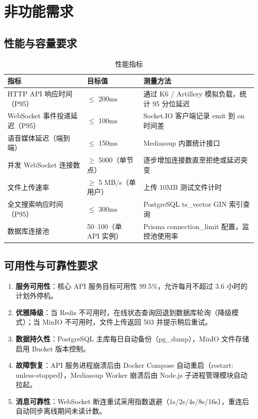 \section{非功能需求}

\subsection{性能与容量要求}

\begin{table}[H]
\centering
\caption{性能指标}
\begin{tabularx}{\textwidth}{L{3cm}L{2cm}Y}
\toprule
\textbf{指标} & \textbf{目标值} & \textbf{测量方法} \\
\midrule
HTTP API 响应时间（P95） & $\le$ 200ms & 通过 K6 / Artillery 模拟负载，统计 95 分位延迟 \\
WebSocket 事件投递延迟（P95） & $\le$ 100ms & Socket.IO 客户端记录 emit 到 on 时间差 \\
语音媒体延迟（端到端） & $\le$ 150ms & Mediasoup 内置统计接口 \\
并发 WebSocket 连接数 & $\ge$ 5000（单节点） & 逐步增加连接数直至拒绝或延迟突变 \\
文件上传速率 & $\ge$ 5 MB/s（单用户） & 上传 10MB 测试文件计时 \\
全文搜索响应时间（P95） & $\le$ 300ms & PostgreSQL ts\_vector GIN 索引查询 \\
数据库连接池 & 50--100（单 API 实例） & Prisma connection\_limit 配置，监控池使用率 \\
\bottomrule
\end{tabularx}
\label{tab:perf}
\end{table}

\subsection{可用性与可靠性要求}

\begin{enumerate}[itemsep=0pt]
  \item \textbf{服务可用性}：核心 API 服务目标可用性 99.5\%，允许每月不超过 3.6 小时的计划外停机。
  \item \textbf{优雅降级}：当 Redis 不可用时，在线状态查询回退到数据库轮询（降级模式）；当 MinIO 不可用时，文件上传返回 503 并提示稍后重试。
  \item \textbf{数据持久性}：PostgreSQL 主库每日自动备份（pg\_dump），MinIO 文件存储启用 Bucket 版本控制。
  \item \textbf{故障恢复}：API 服务进程崩溃后由 Docker Compose 自动重启（restart: unless-stopped），Mediasoup Worker 崩溃后由 Node.js 子进程管理模块自动拉起。
  \item \textbf{消息可靠性}：WebSocket 断连重试采用指数退避（1s/2s/4s/8s/16s），重连后自动同步离线期间未读计数。
\end{enumerate}

